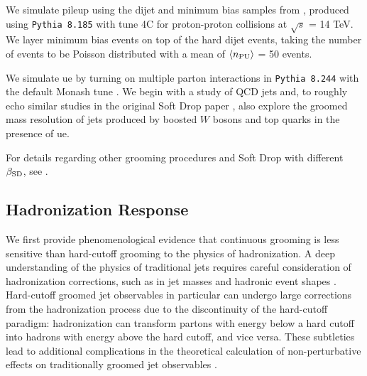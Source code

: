 We simulate \gls{pileup} using the dijet and minimum bias samples from , produced using \texttt{Pythia 8.185} with tune 4C for proton-proton collisions at \(\sqrt{s}\) = 14 TeV.
%
We layer minimum bias events on top of the hard dijet events, taking the number of  events to be Poisson distributed with a mean of \(\langle n_{\rm PU}\rangle\) = 50 events.

We simulate \gls{ue} by turning on multiple parton interactions in \texttt{Pythia 8.244} \cite{Sjostrand:2014zea} with the default Monash tune \cite{Skands:2014pea}.
%
We begin with a study of QCD jets and, to roughly echo similar studies in the original Soft Drop paper \cite{Larkoski:2014wba}, also explore the groomed mass resolution of jets produced by boosted \(W\) bosons and top quarks in the presence of \gls{ue}.

For details regarding other \PIRANHA{} grooming procedures and Soft Drop with different \(\beta_{\rm SD}\), see .




\subsection{Hadronization Response}
\label{sec:pira-hadronization}

We first provide phenomenological evidence that continuous grooming is less sensitive than hard-cutoff grooming to the physics of \gls{hadronization}.
%
A deep understanding of the physics of traditional jets requires careful consideration of \gls{hadronization} corrections, such as in jet masses \cite{Hoang:2019ceu, Marzani:2017kqd, Benkendorfer:2021unv} and hadronic event shapes \cite{Dokshitzer:1995zt, Baron:2020xoi}.
%
Hard-cutoff groomed jet observables in particular can undergo large corrections from the \gls{hadronization} process due to the discontinuity of the hard-cutoff paradigm:
%
\gls{hadronization} can transform partons with energy below a hard cutoff into hadrons with energy above the hard cutoff, and vice versa.
%
These subtleties lead to additional complications in the theoretical calculation of non-perturbative effects on traditionally groomed jet observables \cite{Hoang:2019ceu}.

